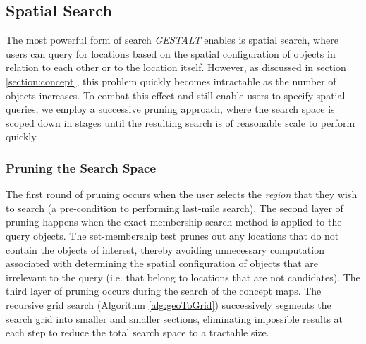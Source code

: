 \subsection{Spatial Search}

The most powerful form of search \emph{GESTALT} enables is spatial search, where users can query for locations based on the spatial configuration of objects in relation to each other or to the location itself.
However, as discussed in section \ref{section:concept}, this problem quickly becomes intractable as the number of objects increases.
To combat this effect and still enable users to specify spatial queries, we employ a successive pruning approach, where the search space is scoped down in stages until the resulting search is of reasonable scale to perform quickly.

\subsubsection{Pruning the Search Space}
The first round of pruning occurs when the user selects the \emph{region} that they wish to search (a pre-condition to performing last-mile search). 
The second layer of pruning happens when the exact membership search method is applied to the query objects.
The set-membership test prunes out any locations that do not contain the objects of interest, thereby avoiding unnecessary computation associated with determining the spatial configuration of objects that are irrelevant to the query (i.e. that belong to locations that are not candidates).
The third layer of pruning occurs during the search of the concept maps. 
The recursive grid search (Algorithm \ref{alg:geoToGrid}) successively segments the search grid into smaller and smaller sections, eliminating impossible results at each step to reduce the total search space to a tractable size.

